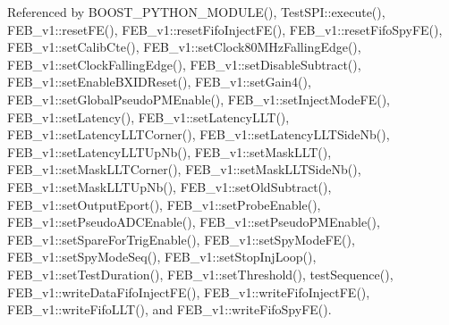 Referenced by B\+O\+O\+S\+T\+\_\+\+P\+Y\+T\+H\+O\+N\+\_\+\+M\+O\+D\+U\+L\+E(), Test\+S\+P\+I\+::execute(), F\+E\+B\+\_\+v1\+::reset\+F\+E(), F\+E\+B\+\_\+v1\+::reset\+Fifo\+Inject\+F\+E(), F\+E\+B\+\_\+v1\+::reset\+Fifo\+Spy\+F\+E(), F\+E\+B\+\_\+v1\+::set\+Calib\+Cte(), F\+E\+B\+\_\+v1\+::set\+Clock80\+M\+Hz\+Falling\+Edge(), F\+E\+B\+\_\+v1\+::set\+Clock\+Falling\+Edge(), F\+E\+B\+\_\+v1\+::set\+Disable\+Subtract(), F\+E\+B\+\_\+v1\+::set\+Enable\+B\+X\+I\+D\+Reset(), F\+E\+B\+\_\+v1\+::set\+Gain4(), F\+E\+B\+\_\+v1\+::set\+Global\+Pseudo\+P\+M\+Enable(), F\+E\+B\+\_\+v1\+::set\+Inject\+Mode\+F\+E(), F\+E\+B\+\_\+v1\+::set\+Latency(), F\+E\+B\+\_\+v1\+::set\+Latency\+L\+L\+T(), F\+E\+B\+\_\+v1\+::set\+Latency\+L\+L\+T\+Corner(), F\+E\+B\+\_\+v1\+::set\+Latency\+L\+L\+T\+Side\+Nb(), F\+E\+B\+\_\+v1\+::set\+Latency\+L\+L\+T\+Up\+Nb(), F\+E\+B\+\_\+v1\+::set\+Mask\+L\+L\+T(), F\+E\+B\+\_\+v1\+::set\+Mask\+L\+L\+T\+Corner(), F\+E\+B\+\_\+v1\+::set\+Mask\+L\+L\+T\+Side\+Nb(), F\+E\+B\+\_\+v1\+::set\+Mask\+L\+L\+T\+Up\+Nb(), F\+E\+B\+\_\+v1\+::set\+Old\+Subtract(), F\+E\+B\+\_\+v1\+::set\+Output\+Eport(), F\+E\+B\+\_\+v1\+::set\+Probe\+Enable(), F\+E\+B\+\_\+v1\+::set\+Pseudo\+A\+D\+C\+Enable(), F\+E\+B\+\_\+v1\+::set\+Pseudo\+P\+M\+Enable(), F\+E\+B\+\_\+v1\+::set\+Spare\+For\+Trig\+Enable(), F\+E\+B\+\_\+v1\+::set\+Spy\+Mode\+F\+E(), F\+E\+B\+\_\+v1\+::set\+Spy\+Mode\+Seq(), F\+E\+B\+\_\+v1\+::set\+Stop\+Inj\+Loop(), F\+E\+B\+\_\+v1\+::set\+Test\+Duration(), F\+E\+B\+\_\+v1\+::set\+Threshold(), test\+Sequence(), F\+E\+B\+\_\+v1\+::write\+Data\+Fifo\+Inject\+F\+E(), F\+E\+B\+\_\+v1\+::write\+Fifo\+Inject\+F\+E(), F\+E\+B\+\_\+v1\+::write\+Fifo\+L\+L\+T(), and F\+E\+B\+\_\+v1\+::write\+Fifo\+Spy\+F\+E().


